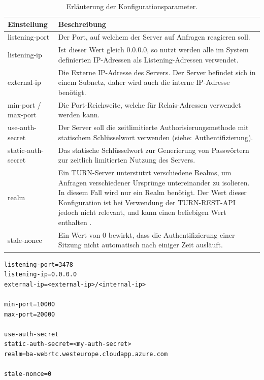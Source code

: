 \begin{table}[ht]
\centering
\begin{tabularx}{\textwidth}{lX}
\toprule
Einstellung&Beschreibung\\

\midrule
listening-port&Der Port, auf welchem der Server auf Anfragen reagieren soll.\\
listening-ip&Ist dieser Wert gleich 0.0.0.0, so nutzt werden alle im System definierten IP-Adressen als Listening-Adressen verwendet.\\
external-ip&Die Externe IP-Adresse des Servers. Der Server befindet sich in einem Subnetz, daher wird auch die interne IP-Adresse benötigt.\\
min-port / max-port&Die Port-Reichweite, welche für Relais-Adressen verwendet werden kann.\\
use-auth-secret&Der Server soll die zeitlimitierte Authorisierungsmethode mit statischem Schlüsselwort verwenden (siehe: Authentifizierung).\\
static-auth-secret&Das statische Schlüsselwort zur Generierung von Passwörtern zur zeitlich limitierten Nutzung des Servers.\\
realm&Ein TURN-Server unterstützt verschiedene \glqq{}Realms\grqq{}, um Anfragen verschiedener Ursprünge untereinander zu isolieren. In diesem Fall wird nur ein \glqq{}Realm\grqq{} benötigt. Der Wert dieser Konfiguration ist bei Verwendung der TURN-REST-API jedoch nicht relevant, und kann einen beliebigen Wert enthalten \cite{turnrestRFC}.\\
stale-nonce&Ein Wert von 0 bewirkt, dass die Authentifizierung einer Sitzung nicht automatisch nach einiger Zeit ausläuft.\\
\bottomrule

\end{tabularx}
\caption{Erläuterung der Konfigurationsparameter.}
\label{table:coturnConfig}
\end{table}

\lstset{style=STYLE_COMMAND_LINE_ARGUMENT_SINGLE_LINE}
\begin{singlespace}
\begin{minipage}{\textwidth}
\begin{lstlisting}[caption={Coturn-Konfigurationsdatei -- turnserver.conf}, captionpos=b, label={lst:coturnConfig}]
listening-port=3478
listening-ip=0.0.0.0
external-ip=<external-ip>/<internal-ip>

min-port=10000
max-port=20000

use-auth-secret
static-auth-secret=<my-auth-secret>
realm=ba-webrtc.westeurope.cloudapp.azure.com

stale-nonce=0
\end{lstlisting}
\end{minipage}
\end{singlespace}

